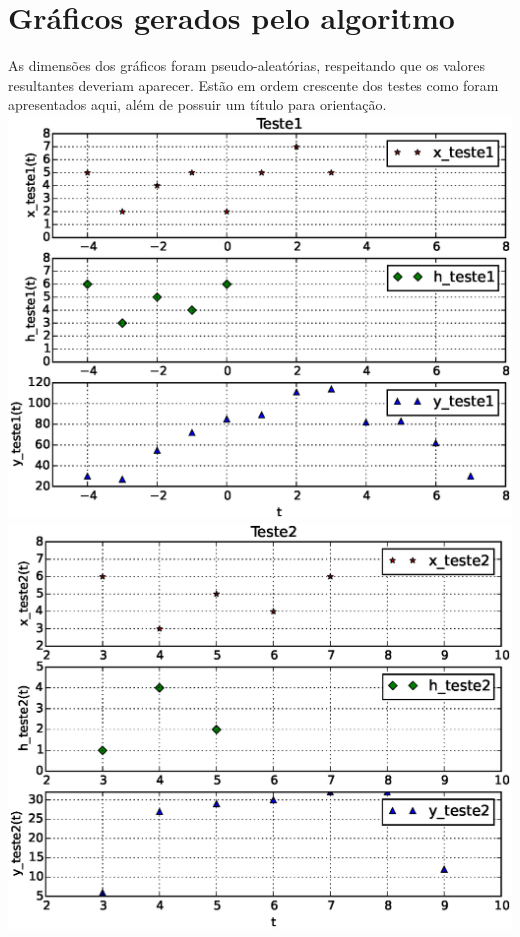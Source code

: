 \documentclass[dvipdfm, a4paper, 11pt]{report}
\begin{document}
{\section{Gráficos gerados pelo algoritmo}
As dimensões dos gráficos foram pseudo-aleatórias, respeitando que os valores resultantes deveriam aparecer. Estão em ordem crescente dos testes como foram apresentados aqui, além de possuir um título para orientação.\\
\includegraphics[scale = 0.5]{Teste1.eps}\\
\includegraphics[scale = 0.5]{Teste2.eps}\\
}
\end{document}
